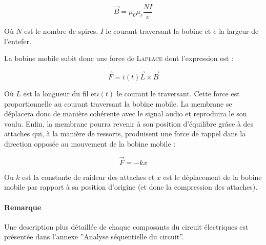 $$\vec{B} = \mu_0\mu_r\frac{NI}{e}$$

Où $N$ est le nombre de spires, $I$ le courant traversant la bobine et $e$ la largeur de 
l'entefer.

La bobine mobile subit donc une force de \textsc{Laplace} dont l'expression est :

$$\vec{F} = i(t)\vec{L}\times{\vec{B}}$$ 

Où $L$ est la longueur du fil et$i(t)$ le courant le traversant. Cette force est proportionnelle
au courant traversant
la bobine mobile. La membrane se déplacera donc de manière cohérente avec le signal audio
et reproduira le son voulu. Enfin, la membrane pourra revenir à son position d'équilibre
grâce à des attaches qui, à la manière de ressorts, produisent une force de rappel dans la
direction opposée au mouvement de la bobine mobile :

$$\vec{F} = -kx$$ %

Ou $k$ est la constante de raideur des attaches et $x$ est le déplacement de la bobine mobile
par rapport à sa position d'origine (et donc la compression des attaches).

\paragraph{Remarque}
Une description plus détaillée de chaque composants du circuit électriques est présentée
dans l'annexe ''Analyse séquentielle du circuit''.

